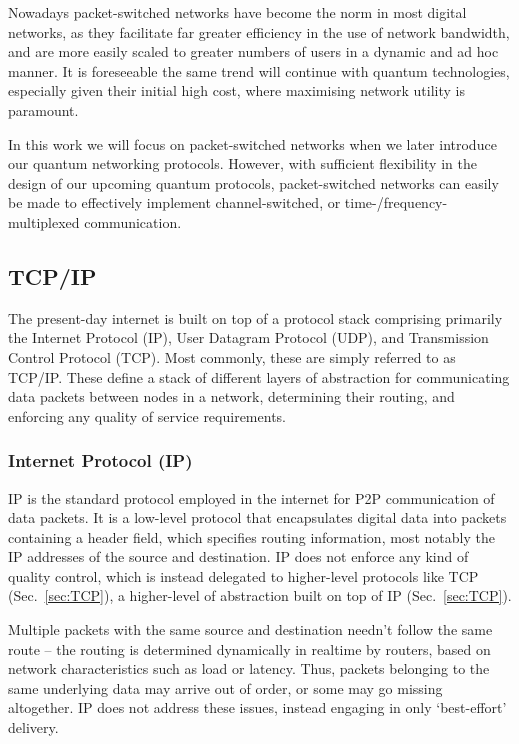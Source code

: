 \documentclass[aps,rmp,twocolumn,amsmath,amssymb,nofootinbib,superscriptaddress,longbibliography,floatfix,table-of-contents,eqsecnum]{revtex4-1}
\begin{document}
Nowadays packet-switched networks have become the norm in most digital networks, as they facilitate far greater efficiency in the use of network bandwidth, and are more easily scaled to greater numbers of users in a dynamic and ad hoc manner. It is foreseeable the same trend will continue with quantum technologies, especially given their initial high cost, where maximising network utility is paramount.

In this work we will focus on packet-switched networks when we later introduce our quantum networking protocols. However, with sufficient flexibility in the design of our upcoming quantum protocols, packet-switched networks can easily be made to effectively implement channel-switched, or time-/frequency-multiplexed communication.

%
%

\subsection{TCP/IP} 

The present-day internet is built on top of a protocol stack comprising primarily the Internet Protocol (IP), User Datagram Protocol (UDP), and Transmission Control Protocol (TCP). Most commonly, these are simply referred to as TCP/IP. These define a stack of different layers of abstraction for communicating data packets between nodes in a network, determining their routing, and enforcing any quality of service requirements.

%
%

\subsubsection{Internet Protocol (IP)} 

IP is the standard protocol employed in the internet for P2P communication of data packets. It is a low-level protocol that encapsulates digital data into packets containing a header field, which specifies routing information, most notably the IP addresses of the source and destination. IP does not enforce any kind of quality control, which is instead delegated to higher-level protocols like TCP (Sec.~\ref{sec:TCP}), a higher-level of abstraction built on top of IP (Sec.~\ref{sec:TCP}).

Multiple packets with the same source and destination needn't follow the same route -- the routing is determined dynamically in realtime by routers, based on network characteristics such as load or latency. Thus, packets belonging to the same underlying data may arrive out of order, or some may go missing altogether. IP does not address these issues, instead engaging in only `best-effort' delivery. 
\end{document}
